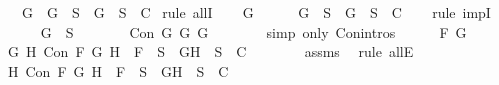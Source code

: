 \begin{isabellebody}
\ \ \ {\isachardoublequoteopen}{\isasymforall}G{\isachardot}\ \isactrlbold {\isasymnot}\ {\isacharparenleft}\isactrlbold {\isasymnot}G{\isacharparenright}\ {\isasymin}\ S\ {\isasymlongrightarrow}\ {\isacharbraceleft}G{\isacharbraceright}\ {\isasymunion}\ S\ {\isasymin}\ C{\isachardoublequoteclose}\isanewline
%
\isadelimproof
%
\endisadelimproof
%
\isatagproof
{}\isamarkupfalse%
\ {\isacharparenleft}rule\ allI{\isacharparenright}\isanewline
\ \ \isamarkupfalse%
\ G\ \isanewline
\ \ \isamarkupfalse%
\ {\isachardoublequoteopen}\isactrlbold {\isasymnot}\ {\isacharparenleft}\isactrlbold {\isasymnot}G{\isacharparenright}\ {\isasymin}\ S\ {\isasymlongrightarrow}\ {\isacharbraceleft}G{\isacharbraceright}\ {\isasymunion}\ S\ {\isasymin}\ C{\isachardoublequoteclose}\isanewline
\ \ \isamarkupfalse%
\ {\isacharparenleft}rule\ impI{\isacharparenright}\isanewline
\ \ \ \ \isamarkupfalse%
\ {\isachardoublequoteopen}\isactrlbold {\isasymnot}{\isacharparenleft}\isactrlbold {\isasymnot}G{\isacharparenright}\ {\isasymin}\ S{\isachardoublequoteclose}\isanewline
\ \ \ \ \isamarkupfalse%
\ \isamarkupfalse%
\ {\isachardoublequoteopen}Con\ {\isacharparenleft}\isactrlbold {\isasymnot}{\isacharparenleft}\isactrlbold {\isasymnot}G{\isacharparenright}{\isacharparenright}\ G\ G{\isachardoublequoteclose}\isanewline
\ \ \ \ \ \ \isamarkupfalse%
\ {\isacharparenleft}simp\ only{\isacharcolon}\ Con{\isachardot}intros{\isacharparenleft}{}{\isacharparenright}{\isacharparenright}\isanewline
\ \ \ \ \isamarkupfalse%
\ {\isacharquery}F{\isacharequal}{\isachardoublequoteopen}\isactrlbold {\isasymnot}{\isacharparenleft}\isactrlbold {\isasymnot}\ G{\isacharparenright}{\isachardoublequoteclose}\isanewline
\ \ \ \ \isamarkupfalse%
\ {\isachardoublequoteopen}{\isasymforall}G\ H{\isachardot}\ Con\ {\isacharquery}F\ G\ H\ {\isasymlongrightarrow}\ {\isacharquery}F\ {\isasymin}\ S\ {\isasymlongrightarrow}\ {\isacharbraceleft}G{\isacharcomma}H{\isacharbraceright}\ {\isasymunion}\ S\ {\isasymin}\ C{\isachardoublequoteclose}\isanewline
\ \ \ \ \ \ \isamarkupfalse%
\ assms\ \isamarkupfalse%
\ {\isacharparenleft}rule\ allE{\isacharparenright}\isanewline
\ \ \ \ \isamarkupfalse%
\ \isamarkupfalse%
\ {\isachardoublequoteopen}{\isasymforall}H{\isachardot}\ Con\ {\isacharquery}F\ G\ H\ {\isasymlongrightarrow}\ {\isacharquery}F\ {\isasymin}\ S\ {\isasymlongrightarrow}\ {\isacharbraceleft}G{\isacharcomma}H{\isacharbraceright}\ {\isasymunion}\ S\ {\isasymin}\ C{\isachardoublequoteclose}\isanewline

\end{isabellebody}
